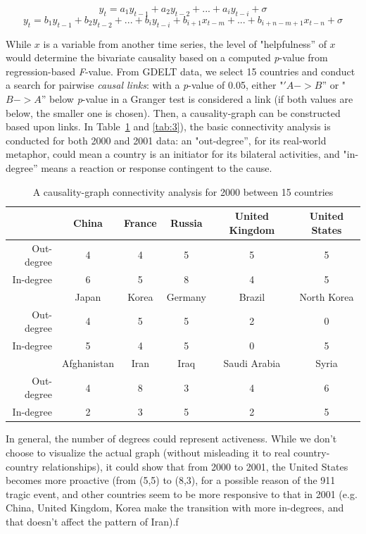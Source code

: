 \documentclass[runningheads,a4paper]{llncs}
\begin{document}
\begin{equation}
\label{eq:1}
	y_{t} = a_{1}y_{t-1}+a_{2}y_{t-2}+...+a_{i}y_{t-i}+\sigma
\end{equation} 
\begin{equation}
\label{eq:2}
	y_{t} = b_{1}y_{t-1}+b_{2}y_{t-2}+...+b_{i}y_{t-i}+b_{i+1}x_{t-m}+...+b_{i+n-m+1}x_{t-n}+\sigma
\end{equation} 

While $x$ is a variable from another time series, the level of "helpfulness'' of $x$ would determine the bivariate causality based on a computed {\em p}-value from regression-based {\em F}-value. From GDELT data, we select 15 countries  and conduct a search for pairwise {\em causal links}: with a {\em p}-value of 0.05, either "$'A->B$'' or "$B->A$'' below {\em p}-value in a Granger test is considered a link (if both values are below, the smaller one is chosen). Then, a causality-graph can be constructed based upon links. In Table~\ref{tab:2} and \ref{tab:3}), the basic connectivity analysis is conducted for both 2000 and 2001 data: an "out-degree'', for its real-world metaphor, could mean a country is an initiator for its bilateral activities, and "in-degree'' means a reaction or response contingent to the cause.

\begin{table}
\caption{A causality-graph connectivity analysis for 2000 between 15 countries}
\centering
\begin{tabular}{r c c c c c }
\hline\hline
{} & China &  France & Russia & United Kingdom & United States   \\
\hline
Out-degree  & 4 &  4 & 5 & 5 & 5 \\
\hline
In-degree  & 6 & 5 & 8 & 4 & 5\\
\hline
{} & Japan & Korea & Germany & Brazil & North Korea \\
\hline
Out-degree &  4 & 5 & 5 & 2 & 0 \\
\hline
In-degree  & 5 & 4 & 5 & 0 & 5 \\
\hline
{}  & Afghanistan & Iran & Iraq & Saudi Arabia & Syria\\
\hline
Out-degree   & 4 & 8 & 3 & 4 & 6\\
\hline
In-degree   & 2 & 3 & 5 & 2 & 5 \\
\hline\hline
\end{tabular}
\label{tab:2}
\end{table}

 In general, the number of degrees could represent activeness. While we don't choose to visualize the actual graph (without misleading it to real country-country relationships), it could show that from 2000 to 2001, the United States becomes more proactive (from (5,5) to (8,3), for a possible reason of the 911 tragic event, and other countries seem to be more responsive to that in 2001 (e.g. China,  United Kingdom, Korea make the transition with more in-degrees, and that doesn't affect the pattern of Iran).ƒ
\end{document}
